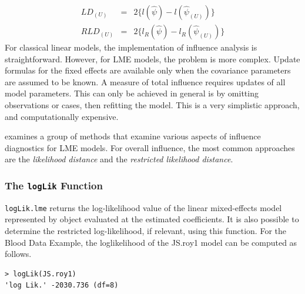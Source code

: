 \documentclass[Main.tex]{subfiles}
\begin{document}
 
 \begin{eqnarray}
 LD_{(U)} &=& 2\{l(\hat{\psi}) - l( \hat{\psi}_{(U)}) \}\\
 RLD_{(U)} &=& 2\{l_{R}(\hat{\psi}) - l_{R}(\hat{\psi}_{(U)})\}
 \end{eqnarray}
For classical linear models, the implementation of influence analysis is straightforward.
However, for LME models, the problem is more complex. Update formulas for the fixed effects are available only when the covariance parameters are assumed to be known. A measure of total influence requires updates of all model parameters. This can only be achieved in general is by omitting observations or cases, then refitting the model. This is a very simplistic approach, and computationally expensive.

\citet{west} examines a group of methods that examine various aspects of influence diagnostics for LME models.
For overall influence, the most common approaches are the \textit{likelihood distance} and the \textit{restricted likelihood distance}.

\subsubsection{The \texttt{logLik} Function}
\texttt{logLik.lme} returns the log-likelihood value of the linear mixed-effects model represented by object evaluated at the estimated coefficients. It is also possible to determine the restricted log-likelihood, if relevant, using this function. For the Blood Data Example,  the loglikelihood of the JS.roy1 model can be computed as follows.
\begin{framed}
\begin{verbatim}
> logLik(JS.roy1)
'log Lik.' -2030.736 (df=8)
\end{verbatim}
\end{framed}
\newpage
\end{document}
